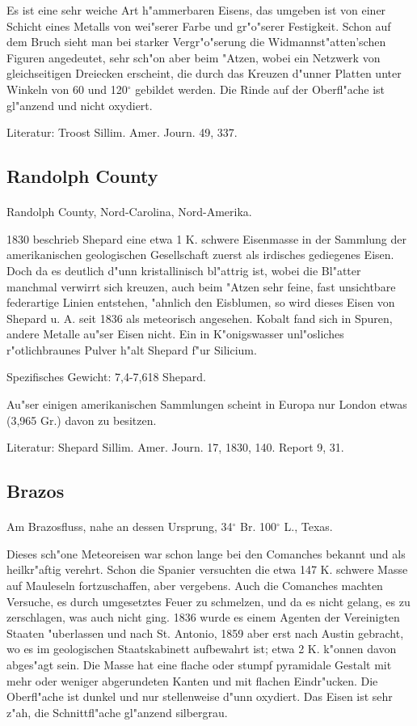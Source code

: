 \documentclass[a4paper, 11pt, oneside]{article}
\begin{document}
Es ist eine sehr weiche Art h"ammerbaren Eisens, das umgeben ist von einer Schicht eines Metalls von wei"serer Farbe und gr"o"serer Festigkeit. Schon auf dem Bruch sieht man bei starker Vergr"o"serung die Widmannst"atten'schen Figuren angedeutet, sehr sch"on aber beim "Atzen, wobei ein Netzwerk von gleichseitigen Dreiecken erscheint, die durch das Kreuzen d"unner Platten unter Winkeln von 60 und 120$^\circ$ gebildet werden. Die Rinde auf der Oberfl"ache ist gl"anzend und nicht oxydiert.

Literatur: Troost Sillim. Amer. Journ. 49, 337.

\subsection{Randolph County}
\normalsize
\paragraph{}
Randolph County, Nord-Carolina, Nord-Amerika.

1830 beschrieb Shepard eine etwa 1 K. schwere Eisenmasse in der Sammlung der amerikanischen geologischen Gesellschaft zuerst als irdisches gediegenes Eisen. Doch da es deutlich d"unn kristallinisch bl"attrig ist, wobei die Bl"atter manchmal verwirrt sich kreuzen, auch beim "Atzen sehr feine, fast unsichtbare federartige Linien entstehen, "ahnlich den Eisblumen, so wird dieses Eisen von Shepard u. A. seit 1836 als meteorisch angesehen. Kobalt fand sich in Spuren, andere Metalle au"ser Eisen nicht. Ein in K"onigswasser unl"osliches r"otlichbraunes Pulver h"alt Shepard f"ur Silicium.

Spezifisches Gewicht: 7,4-7,618 Shepard.

Au"ser einigen amerikanischen Sammlungen scheint in Europa nur London etwas (3,965 Gr.) davon zu besitzen.

Literatur: Shepard Sillim. Amer. Journ. 17, 1830, 140. Report 9, 31.

\subsection{Brazos}
\normalsize
\paragraph{}
Am Brazosfluss, nahe an dessen Ursprung, 34$^\circ$ Br. 100$^\circ$ L., Texas.

Dieses sch"one Meteoreisen war schon lange bei den Comanches bekannt und als heilkr"aftig verehrt. Schon die Spanier versuchten die etwa 147 K. schwere Masse auf Mauleseln fortzuschaffen, aber vergebens. Auch die Comanches machten Versuche, es durch umgesetztes Feuer zu schmelzen, und da es nicht gelang, es zu zerschlagen, was auch nicht ging. 1836 wurde es einem Agenten der Vereinigten Staaten "uberlassen und nach St. Antonio, 1859 aber erst nach Austin gebracht, wo es im geologischen Staatskabinett aufbewahrt ist; etwa 2 K. k"onnen davon abges"agt sein. Die Masse hat eine flache oder stumpf pyramidale Gestalt mit mehr oder weniger abgerundeten Kanten und mit flachen Eindr"ucken. Die Oberfl"ache ist dunkel und nur stellenweise d"unn oxydiert. Das Eisen ist sehr z"ah, die Schnittfl"ache gl"anzend silbergrau.
\end{document}
